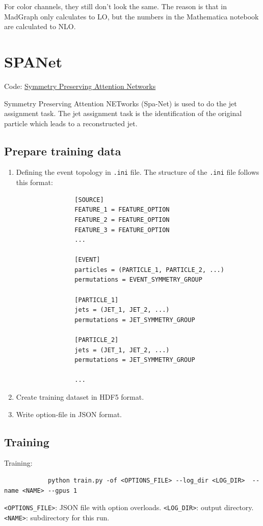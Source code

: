 \documentclass[12pt]{article}
\begin{document}
	For color channels, they still don't look the same. The reason is that in MadGraph only calculates to LO, but the numbers in the Mathematica notebook are calculated to NLO.
\section{SPANet}%
\label{sec:spanet}
	Code: \href{https://github.com/Alexanders101/SPANet}{Symmetry Preserving Attention Networks}

	Symmetry Preserving Attention NETworks (Spa-Net) is used to do the jet assignment task. The jet assignment task is the identification of the original particle which leads to a reconstructed jet.

	\subsection{Prepare training data}%
	\label{sub:prepare_training_data}
		\begin{enumerate}
			\item Defining the event topology in \verb+.ini+ file. The structure of the \verb+.ini+ file follows this format:

			\begin{verbatim}
				[SOURCE]
				FEATURE_1 = FEATURE_OPTION
				FEATURE_2 = FEATURE_OPTION
				FEATURE_3 = FEATURE_OPTION
				...

				[EVENT]
				particles = (PARTICLE_1, PARTICLE_2, ...)
				permutations = EVENT_SYMMETRY_GROUP

				[PARTICLE_1]
				jets = (JET_1, JET_2, ...)
				permutations = JET_SYMMETRY_GROUP

				[PARTICLE_2]
				jets = (JET_1, JET_2, ...)
				permutations = JET_SYMMETRY_GROUP

				...
			\end{verbatim}

			\item Create training dataset in HDF5 format.

			\item Write option-file in JSON format.

		\end{enumerate}
	\subsection{Training}%
	\label{sub:training}
		Training:
		\begin{verbatim}
			python train.py -of <OPTIONS_FILE> --log_dir <LOG_DIR>  --name <NAME> --gpus 1
		\end{verbatim}
		\verb+<OPTIONS_FILE>+: JSON file with option overloads. \verb+<LOG_DIR>+: output directory. \verb+<NAME>+: subdirectory for this run. 
\end{document}
